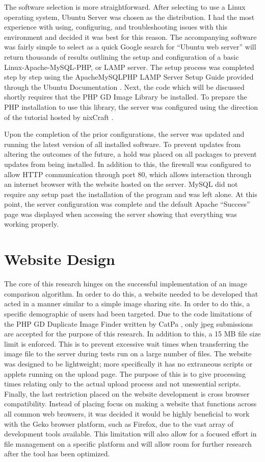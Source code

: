 The software selection is more straightforward. After selecting to use a Linux operating system, Ubuntu Server was chosen as the distribution. I had the most experience with using, configuring, and troubleshooting issues with this environment and decided it was best for this reason. The accompanying software was fairly simple to select as a quick Google search for ``Ubuntu web server'' will return thousands of results outlining the setup and configuration of a basic Linux-Apache-MySQL-PHP, or LAMP server. The setup process was completed step by step using the ApacheMySQLPHP LAMP Server Setup Guide provided through the Ubuntu Documentation \cite{ubuntu:lampsetup}. Next, the code which will be discussed shortly requires that the PHP GD Image Library be installed. To prepare the PHP installation to use this library, the server was configured using the direction of the tutorial hosted by nixCraft \cite{nix:gdsetup}.

Upon the completion of the prior configurations, the server was updated and running the latest version of all installed software. To prevent updates from altering the outcomes of the future, a hold was placed on all packages to prevent updates from being installed. In addition to this, the firewall was configured to allow HTTP communication through port 80, which allows interaction through an internet browser with the website hosted on the server. MySQL did not require any setup past the installation of the program and was left alone. At this point, the server configuration was complete and the default Apache ``Success'' page was displayed when accessing the server showing that everything was working properly.

\section{Website Design} \label{sec:websitedesign}
The core of this research hinges on the successful implementation of an image comparison algorithm. In order to do this, a website needed to be developed that acted in a manner similar to a simple image sharing site. In order to do this, a specific demographic of users had been targeted. Due to the code limitations of the PHP GD Duplicate Image Finder written by CatPa \cite{catpa:gdcode}, only jpeg submissions are accepted for the purpose of this research. In addition to this, a 15 MB file size limit is enforced. This is to prevent excessive wait times when transferring the image file to the server during tests run on a large number of files. The website was designed to be lightweight; more specifically it has no extraneous scripts or applets running on the upload page. The purpose of this is to give processing times relating only to the actual upload process and not unessential scripts. Finally, the last restriction placed on the website development is cross browser compatibility. Instead of placing focus on making a website that functions across all common web browsers, it was decided it would be highly beneficial to work with the Geko browser platform, such as Firefox, due to the vast array of development tools available. This limitation will also allow for a focused effort in file management on a specific platform and will allow room for further research after the tool has been optimized.

